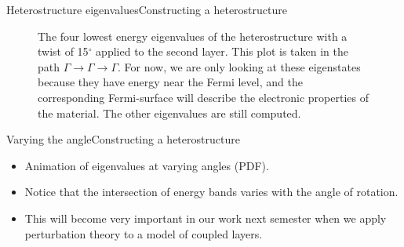 \documentclass[9pt]{beamer}
\begin{document}
\begin{frame}{Heterostructure eigenvalues}{Constructing a heterostructure}
  \begin{figure}
    \centering
    \caption{The four lowest energy eigenvalues of the heterostructure with a twist of 15$^\circ$ applied to the second layer. This plot is taken in the path $\Gamma \rightarrow \Gamma \rightarrow \Gamma$. For now, we are only looking at these eigenstates because they have energy near the Fermi level, and the corresponding Fermi-surface will describe the electronic properties of the material. The other eigenvalues are still computed.}
  \end{figure}
\end{frame}

\begin{frame}{Varying the angle}{Constructing a heterostructure}
  \begin{itemize}
    \item Animation of eigenvalues at varying angles (PDF).
    \item Notice that the intersection of energy bands varies with the angle of rotation.
    \item This will become very important in our work next semester when we apply perturbation theory to a model of coupled layers.
  \end{itemize}
\end{frame}
\end{document}
